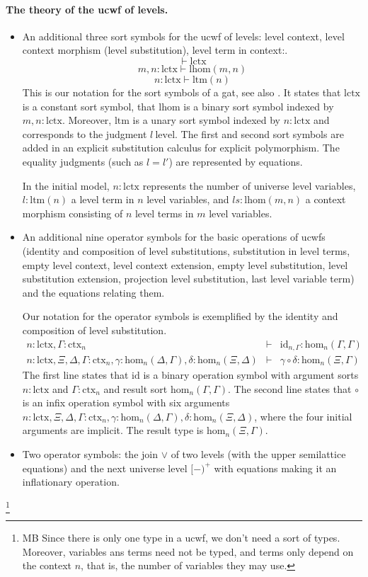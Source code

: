 \documentclass[11pt,a4paper]{article}
\theoremstyle{definition}
\newcommand{\id}{\mathsf{id}}
\def\lhom{\mathrm{lhom}}
\def\Hom{\mathrm{hom}}
\def\id{\mathrm{id}}
\def\lctx{\mathrm{lctx}}
\def\ltm{\mathrm{ltm}}
\def\level{\mathrm{level}}
\newcommand{\ctx}{\mathrm{ctx}}
\begin{document}
\paragraph{The theory of the ucwf of levels.}
\begin{itemize}
\item An additional three sort symbols for the ucwf of levels: level context, level context morphism (level substitution), level term in context:. 
$$
\vdash \lctx
$$
$$
m,n : \lctx \vdash \lhom(m,n)
$$
$$
n : \lctx \vdash  \ltm(n)
$$
This is our notation for the sort symbols of a gat, see also \cite{bezem:hofmann}. It states that $\lctx$ is a constant sort symbol, that $\lhom$ is a binary sort symbol indexed by $m,n : \lctx$. Moreover, $\ltm$ is a unary sort symbol indexed by $n : \lctx$ and corresponds to the judgment $l\ \level$. The first and second sort symbols are added in an explicit substitution calculus for explicit polymorphism. The equality judgments (such as $l = l'$) are represented by equations.  

In the initial model, $n : \lctx$ represents the number of universe level variables, $l : \ltm(n)$ a level term in $n$ level variables, and $ls : \lhom(m,n)$ a context morphism consisting of $n$ level terms in $m$ level variables.

\item An additional nine operator symbols for the basic operations of ucwfs (identity and composition of level substitutions, substitution in level terms, empty level context, level context extension, empty level substitution, level substitution extension, projection level substitution, last level variable term) and the equations relating them.

Our notation for the operator symbols is exemplified by the identity and composition of level substitution.
\begin{eqnarray*}
n : \lctx, \Gamma : \ctx_n &\vdash& \id_{n,\Gamma} : \Hom_n(\Gamma,\Gamma)\\
n : \lctx, \Xi,\Delta,\Gamma : \ctx_n, \gamma : \Hom_n(\Delta,\Gamma), \delta : \Hom_n(\Xi,\Delta) &\vdash&
\gamma \circ \delta : \Hom_n(\Xi,\Gamma)
\end{eqnarray*}
The first line states that $\id$ is a binary operation symbol with argument sorts $n : \lctx$ and  $\Gamma : \ctx_n$ and result sort $\Hom_n(\Gamma,\Gamma)$. The second line states that $\circ$ is an infix operation symbol with six arguments $n : \lctx, \Xi,\Delta,\Gamma : \ctx_n, \gamma : \Hom_n(\Delta,\Gamma), \delta : \Hom_n(\Xi,\Delta)$, where the four initial arguments are implicit. The result type is $\Hom_n(\Xi,\Gamma)$.

\item Two operator symbols: the join $\vee$ of two levels (with the upper semilattice equations) and the next universe level $[-)^+$ with equations making it an inflationary operation.
\end{itemize}
%
\footnote{MB Since there is only one type in a ucwf, we don't need
a sort of types. Moreover, variables ans terms need not be typed, and
terms only depend on the context $n$, that is, the number of variables
they may use.}
\end{document}
